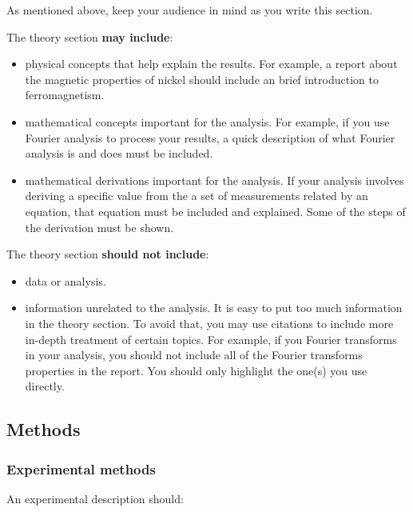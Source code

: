 \documentclass[12pt]{article}
\begin{document}
 As mentioned above, keep your audience in mind as you write this section.

 The theory section {\bf may include}:

 \begin{itemize}
  \item physical concepts that help explain the results. For example, a
  report about the magnetic properties of nickel should include an brief
  introduction to ferromagnetism.
  \item mathematical concepts important for the analysis. For example, if
  you use Fourier analysis to process your results, a quick description of
  what Fourier analysis is and does must be included.
  \item mathematical derivations important for the analysis. If
  your analysis involves deriving a specific value from the a set of
  measurements related by an equation, that equation must be included and
  explained. Some of the steps of the derivation must be shown.
 \end{itemize}

 The theory section {\bf should not include}:

 \begin{itemize}
  \item data or analysis.
  \item information unrelated to the analysis. It is easy to put too much
  information in the theory section. To avoid that, you may use citations
  to include more in-depth treatment of certain topics. For example, if you
  Fourier transforms in your analysis, you should not include all of the
  Fourier transforms properties in the report. You should only highlight the
  one(s) you use directly.
 \end{itemize}

\newpage

\subsection{Methods}
\label{sec:Methods}
\subsubsection{Experimental methods}

 An experimental description should:
\end{document}
